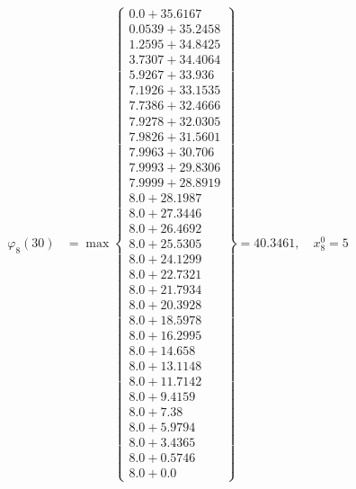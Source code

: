 \documentclass{article}
\begin{document}
\begin{align*}
\varphi_{8}(30) &= \max \left\{ \begin{array}{c}
0.0 + 35.6167 \\
 0.0539 + 35.2458 \\
 1.2595 + 34.8425 \\
 3.7307 + 34.4064 \\
 5.9267 + 33.936 \\
 7.1926 + 33.1535 \\
 7.7386 + 32.4666 \\
 7.9278 + 32.0305 \\
 7.9826 + 31.5601 \\
 7.9963 + 30.706 \\
 7.9993 + 29.8306 \\
 7.9999 + 28.8919 \\
 8.0 + 28.1987 \\
 8.0 + 27.3446 \\
 8.0 + 26.4692 \\
 8.0 + 25.5305 \\
 8.0 + 24.1299 \\
 8.0 + 22.7321 \\
 8.0 + 21.7934 \\
 8.0 + 20.3928 \\
 8.0 + 18.5978 \\
 8.0 + 16.2995 \\
 8.0 + 14.658 \\
 8.0 + 13.1148 \\
 8.0 + 11.7142 \\
 8.0 + 9.4159 \\
 8.0 + 7.38 \\
 8.0 + 5.9794 \\
 8.0 + 3.4365 \\
 8.0 + 0.5746 \\
 8.0 + 0.0
\end{array} \right\}=40.3461, \quad x_{8}^0=5\\
  

\end{align*}
\end{document}

